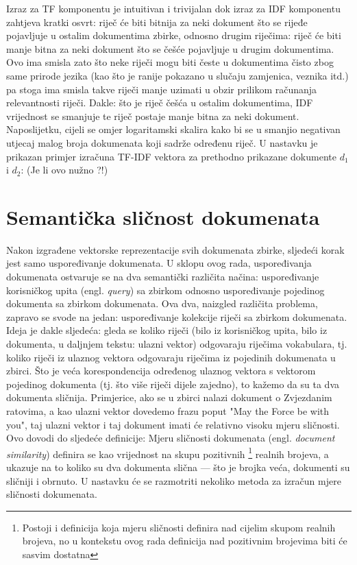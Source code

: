 \documentclass[times, utf8, zavrsni]{fer}
\begin{document}
Izraz za TF komponentu je intuitivan i trivijalan dok izraz za IDF komponentu zahtjeva kratki osvrt: riječ će biti bitnija za neki dokument što se rijeđe pojavljuje u ostalim dokumentima zbirke, odnosno drugim riječima: riječ će biti manje bitna za neki dokument što se češće pojavljuje u drugim dokumentima. Ovo ima smisla zato što neke riječi mogu biti česte u dokumentima čisto zbog same prirode jezika (kao što je ranije pokazano u slučaju zamjenica, veznika itd.) pa stoga ima smisla takve riječi manje uzimati u obzir prilikom računanja relevantnosti riječi. Dakle: što je riječ češća u ostalim dokumentima, IDF vrijednost se smanjuje te riječ postaje manje bitna za neki dokument. Naposlijetku, cijeli se omjer logaritamski skalira kako bi se u smanjio negativan utjecaj malog broja dokumenata koji sadrže određenu riječ. U nastavku je prikazan primjer izračuna TF-IDF vektora za prethodno prikazane dokumente ${d_1}$ i ${d_2}$: (Je li ovo nužno ?!)

\section{Semantička sličnost dokumenata}
\label{subchap:similarity}
Nakon izgrađene vektorske reprezentacije svih dokumenata zbirke, sljedeći korak jest samo uspoređivanje dokumenata. U sklopu ovog rada, uspoređivanja dokumenata ostvaruje se na dva semantički različita načina: uspoređivanje korisničkog upita (engl. \textit{query}) sa zbirkom odnosno uspoređivanje pojedinog dokumenta sa zbirkom dokumenata.
Ova dva, naizgled različita problema, zapravo se svode na jedan: uspoređivanje kolekcije riječi sa zbirkom dokumenata. Ideja je dakle sljedeća: gleda se koliko riječi (bilo iz korisničkog upita, bilo iz dokumenta, u daljnjem tekstu: ulazni vektor) odgovaraju riječima vokabulara, tj. koliko riječi iz ulaznog vektora odgovaraju riječima iz pojedinih dokumenata u zbirci. Što je veća korespondencija određenog ulaznog vektora s vektorom pojedinog dokumenta (tj. što više riječi dijele zajedno), to kažemo da su ta dva dokumenta sličnija. Primjerice, ako se u zbirci nalazi dokument o Zvjezdanim ratovima, a kao ulazni vektor dovedemo frazu poput "May the Force be with you", taj ulazni vektor i taj dokument imati će relativno visoku mjeru sličnosti. Ovo dovodi do sljedeće definicije:
\newline
Mjeru sličnosti dokumenata (engl. \textit{document similarity}) definira se kao vrijednost na skupu pozitivnih \footnote{Postoji i definicija koja mjeru sličnosti definira nad cijelim skupom realnih brojeva, no u kontekstu ovog rada definicija nad pozitivnim brojevima biti će sasvim dostatna} realnih brojeva, a ukazuje na to koliko su dva dokumenta slična — što je brojka veća, dokumenti su sličniji i obrnuto.
U nastavku će se razmotriti nekoliko metoda za izračun mjere sličnosti dokumenata.
\end{document}
